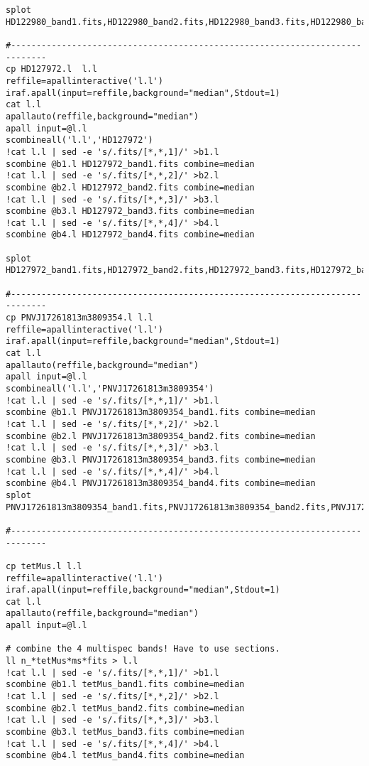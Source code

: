 \begin{verbatim}
splot HD122980_band1.fits,HD122980_band2.fits,HD122980_band3.fits,HD122980_band4.fits

#-----------------------------------------------------------------------------
cp HD127972.l  l.l
reffile=apallinteractive('l.l')
iraf.apall(input=reffile,background="median",Stdout=1)
cat l.l
apallauto(reffile,background="median")
apall input=@l.l
scombineall('l.l','HD127972')
!cat l.l | sed -e 's/.fits/[*,*,1]/' >b1.l
scombine @b1.l HD127972_band1.fits combine=median
!cat l.l | sed -e 's/.fits/[*,*,2]/' >b2.l
scombine @b2.l HD127972_band2.fits combine=median
!cat l.l | sed -e 's/.fits/[*,*,3]/' >b3.l
scombine @b3.l HD127972_band3.fits combine=median
!cat l.l | sed -e 's/.fits/[*,*,4]/' >b4.l
scombine @b4.l HD127972_band4.fits combine=median

splot HD127972_band1.fits,HD127972_band2.fits,HD127972_band3.fits,HD127972_band4.fits

#-----------------------------------------------------------------------------
cp PNVJ17261813m3809354.l l.l
reffile=apallinteractive('l.l')
iraf.apall(input=reffile,background="median",Stdout=1)
cat l.l
apallauto(reffile,background="median")
apall input=@l.l
scombineall('l.l','PNVJ17261813m3809354')
!cat l.l | sed -e 's/.fits/[*,*,1]/' >b1.l
scombine @b1.l PNVJ17261813m3809354_band1.fits combine=median
!cat l.l | sed -e 's/.fits/[*,*,2]/' >b2.l
scombine @b2.l PNVJ17261813m3809354_band2.fits combine=median
!cat l.l | sed -e 's/.fits/[*,*,3]/' >b3.l
scombine @b3.l PNVJ17261813m3809354_band3.fits combine=median
!cat l.l | sed -e 's/.fits/[*,*,4]/' >b4.l
scombine @b4.l PNVJ17261813m3809354_band4.fits combine=median
splot PNVJ17261813m3809354_band1.fits,PNVJ17261813m3809354_band2.fits,PNVJ17261813m3809354_band3.fits,PNVJ17261813m3809354_band4.fits

#-----------------------------------------------------------------------------

cp tetMus.l l.l
reffile=apallinteractive('l.l')
iraf.apall(input=reffile,background="median",Stdout=1)
cat l.l
apallauto(reffile,background="median")
apall input=@l.l

# combine the 4 multispec bands! Have to use sections.
ll n_*tetMus*ms*fits > l.l
!cat l.l | sed -e 's/.fits/[*,*,1]/' >b1.l
scombine @b1.l tetMus_band1.fits combine=median
!cat l.l | sed -e 's/.fits/[*,*,2]/' >b2.l
scombine @b2.l tetMus_band2.fits combine=median
!cat l.l | sed -e 's/.fits/[*,*,3]/' >b3.l
scombine @b3.l tetMus_band3.fits combine=median
!cat l.l | sed -e 's/.fits/[*,*,4]/' >b4.l
scombine @b4.l tetMus_band4.fits combine=median


\end{verbatim}
